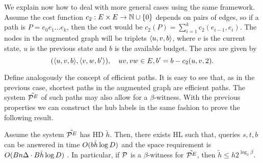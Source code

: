 We explain now how to deal with more general cases using the same framework.
Assume the cost function $c_2:E\times E\to \mathbb{N}\cup \{0\}$ depends on pairs of edges, so if a path is $P=e_0e_1\ldots e_k$, then the cost would be $c_2(P)=\sum_{i=1}^{k}c_2(e_{i-1},e_i)$.
The nodes in the augmented graph will be triplets $\langle u,v,b\rangle$, where $v$ is the current state, $u$ is the previous state and $b$ is the available budget.
The arcs are given by
\[
(\langle u,v,b\rangle,\langle v,w,b'\rangle), \quad uv,vw\in E, b'=b-c_2(u,v,2).
\]

Define analogously the concept of efficient paths.
It is easy to see that, as in the previous case, shortest paths in the augmented graph are efficient paths.
The system $\tilde{\mathcal{P}^E}$ of such paths may also allow for a $\beta$-witness.
With the previous properties we can construct the hub labels in the same fashion to prove the following result.

\begin{theorem}
Assume the system $\tilde{\mathcal{P}^E}$ has HD $\tilde h$.
Then, there exists HL such that, queries $s,t,b$ can be answered in time $O(b\tilde h\log D)$ and the space requirement is $O(Bn\Delta\cdot B\tilde h\log D)$ .
In particular, if $\mathcal{P}$ is a $\beta$-witness for $\tilde {\mathcal{P}^E}$, then $\tilde h\leq h2^{\log_2\beta}$. 
\end{theorem}